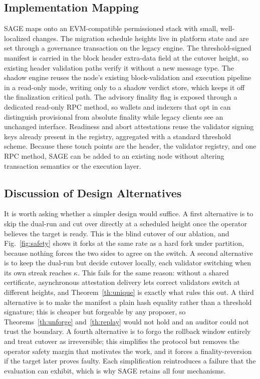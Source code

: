 \documentclass[journal]{IEEEtran}
\begin{document}
\subsection{Implementation Mapping}
SAGE maps onto an EVM-compatible permissioned stack with small, well-localized changes. The
migration schedule heights live in platform state and are set through a governance transaction
on the legacy engine. The threshold-signed manifest is carried in the block header extra-data
field at the cutover height, so existing header validation paths verify it without a new message
type. The shadow engine reuses the node's existing block-validation and execution pipeline in a
read-only mode, writing only to a shadow verdict store, which keeps it off the finalization
critical path. The advisory finality flag is exposed through a dedicated read-only RPC method, so
wallets and indexers that opt in can distinguish provisional from absolute finality while legacy
clients see an unchanged interface. Readiness and abort attestations reuse the validator signing
keys already present in the registry, aggregated with a standard threshold scheme. Because these
touch points are the header, the validator registry, and one RPC method, SAGE can be added to an
existing node without altering transaction semantics or the execution layer.

\subsection{Discussion of Design Alternatives}
It is worth asking whether a simpler design would suffice. A first alternative is to skip the
dual-run and cut over directly at a scheduled height once the operator believes the target is
ready. This is the blind cutover of our ablation, and Fig.~\ref{fig:safety} shows it forks at the
same rate as a hard fork under partition, because nothing forces the two sides to agree on the
switch. A second alternative is to keep the dual-run but decide cutover locally, each validator
switching when its own streak reaches $\kappa$. This fails for the same reason: without a shared
certificate, asynchronous attestation delivery lets correct validators switch at different
heights, and Theorem~\ref{th:unique} is exactly what rules this out. A third alternative is to
make the manifest a plain hash equality rather than a threshold signature; this is cheaper but
forgeable by any proposer, so Theorems~\ref{th:unforge} and~\ref{th:replay} would not hold and an
auditor could not trust the boundary. A fourth alternative is to forgo the rollback window
entirely and treat cutover as irreversible; this simplifies the protocol but removes the operator
safety margin that motivates the work, and it forces a finality-reversion if the target later
proves faulty. Each simplification reintroduces a failure that the evaluation can exhibit, which
is why SAGE retains all four mechanisms.
\end{document}
